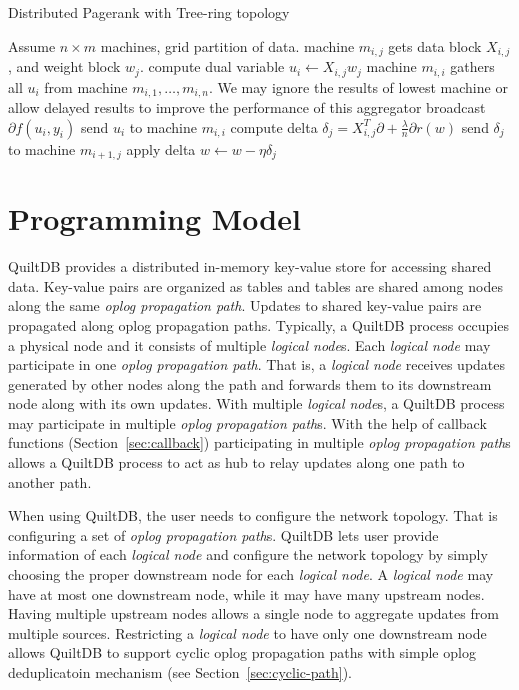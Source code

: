 \documentclass[11pt, twocolumn]{article}
\begin{document}
\begin{algorithm}[tb]
  \caption{Distributed Pagerank with Tree-ring topology}
  \label{algo:loss}
  \begin{algorithmic}[1]
    \REQUIRE Assume $n \times m$ machines, grid partition of data. machine
    $m_{i,j}$  gets data block $X_{i,j}$, and weight block $w_j$.
    \STATE compute dual variable $u_i \gets X_{i,j} w_j$
    \STATE machine $m_{i,i}$ gathers all $u_i$ from machine $m_{i,1}, \ldots,
    m_{i,n}$. We may ignore the results of lowest machine or allow delayed
    results to improve the performance of this aggregator
    \STATE broadcast $\partial f(u_i, y_i)$
    \ELSE
    \STATE send $u_i$ to machine $m_{i,i}$
    \ENDIF
    \STATE compute delta $\delta_j = X_{i,j}^T \partial +
    \frac{\lambda}{n} \partial r(w)$
    \STATE send $\delta_j$ to machine $m_{i+1,j}$
    \STATE apply delta $w \gets w - \eta \delta_j$
    \ENDFOR
    \ENDFOR
  \end{algorithmic}
\end{algorithm}

\section{Programming Model}

QuiltDB provides a distributed in-memory key-value store for accessing shared
data. Key-value pairs are organized as tables and tables are shared among
nodes along the same \emph{oplog propagation path}. Updates to shared key-value
pairs are propagated along {oplog propagation path}s. Typically, a QuiltDB
process occupies a physical node and it
consists of multiple \emph{logical node}s. Each \emph{logical node} may
participate in one \emph{oplog propagation path}. That is, a \emph{logical node}
receives updates generated by other nodes along the path and forwards them to
its downstream node along with its own updates. With multiple \emph{logical
node}s, a QuiltDB process may participate in multiple \emph{oplog propagation
path}s. With the help of callback functions (Section~\ref{sec:callback})
participating in multiple \emph{oplog propagation path}s
allows a QuiltDB process to act as hub to relay updates along one path to
another path.

When using QuiltDB, the user needs to configure the network topology.
That is configuring a set of \emph{oplog propagation path}s. QuiltDB lets user 
provide information of each \emph{logical node} and configure the network 
topology by simply choosing
the proper downstream node for each \emph{logical node}. A \emph{logical node}
may have at most one downstream node, while it may have many upstream nodes.
Having multiple upstream nodes allows a single node to aggregate updates from
multiple sources. Restricting a \emph{logical node} to have only one downstream
node allows QuiltDB to support cyclic {oplog propagation path}s with simple
oplog deduplicatoin mechanism (see Section~\ref{sec:cyclic-path}).
\end{document}
